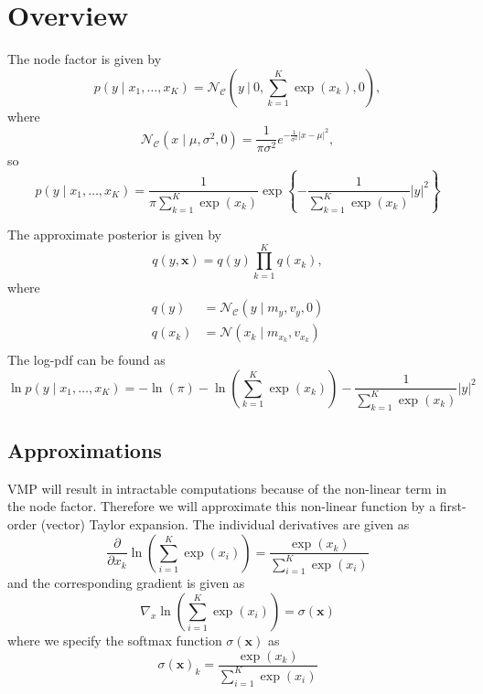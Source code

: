 \section{Overview}
The node factor is given by
\begin{equation}
    p(y\mid x_1,\ldots, x_K) = \mathcal{N}_\mathcal{C}\left(y\ \bigg\vert \ 0, \sum_{k=1}^K \exp (x_k), 0 \right),
\end{equation}
where
\begin{equation}
    \mathcal{N}_\mathcal{C}(x \mid \mu, \sigma^2, 0) = \frac{1}{\pi\sigma^2}e^{-\frac{1}{\sigma^2}|x-\mu|^2},
\end{equation}
so 
\begin{equation}
    p(y\mid x_1,\ldots, x_K) = \frac{1}{\pi\sum_{k=1}^K \exp (x_k)}\exp\left\{-\frac{1}{\sum_{k=1}^K \exp (x_k)}|y|^2\right\}
\end{equation}

The approximate posterior is given by
\begin{equation}
    q(y, \bm{x}) = q(y) \prod_{k=1}^K q(x_k),
\end{equation}
where 
\begin{align}
    q(y) &= \mathcal{N}_\mathcal{C}(y\mid m_y, v_y, 0) \\
    q(x_k) &= \mathcal{N}(x_k\mid m_{x_k}, v_{x_k}) \\
\end{align}
The log-pdf can be found as
\begin{equation}
    \ln p(y \mid x_1, \ldots, x_K) = -\ln(\pi) -\ln\left(\sum_{k=1}^K \exp(x_k)\right) -\frac{1}{\sum_{k=1}^K \exp(x_k)}|y|^2
\end{equation}

\subsection{Approximations}
VMP will result in intractable computations because of the non-linear term in the node factor. Therefore we will approximate this non-linear function by a first-order (vector) Taylor expansion. The individual derivatives are given as 
\begin{equation}
    \frac{\partial}{\partial x_k} \ln \left(\sum_{i=1}^K \exp(x_i) \right) = \frac{\exp(x_k)}{\sum_{i=1}^K \exp(x_i)}
\end{equation}
and the corresponding gradient is given as
\begin{equation}
    \nabla_x \ln \left(\sum_{i=1}^K \exp(x_i) \right) = \sigma(\bm{x})
\end{equation}
where we specify the softmax function $\sigma(\bm{x})$ as 
\begin{equation}
    \sigma(\bm{x})_k = \frac{\exp(x_k)}{\sum_{i=1}^K \exp(x_i)}
\end{equation}


